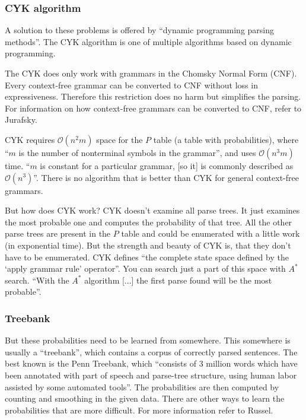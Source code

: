\documentclass[12pt,twoside]{scrartcl}
\theoremstyle{plain}
\theoremstyle{definition}
\theoremstyle{remark}
\begin{document}
		\subsubsection*{CYK algorithm}
		\label{subSubSec:cykAlgorithm}		
		
		A solution to these problems is offered by ``dynamic programming parsing methods''\cite[p.~469]{Jurafsky2009b}. The CYK algorithm is one of multiple algorithms based on dynamic programming.
		
		The CYK does only work with grammars in the Chomsky Normal Form (CNF). Every context-free grammar can be converted to CNF without loss in expressiveness. Therefore this restriction does no harm but simplifies the parsing. For information on how context-free grammars can be converted to CNF, refer to Jurafsky\cite{Jurafsky2009b}.
		
		CYK requires $\mathcal{O}(n^{2}m)$ space for the $P$ table (a table with probabilities), where ``$m$ is the number of nonterminal symbols in the grammar''\cite[p.~893]{Russel2010}, and uses $\mathcal{O}(n^{3}m)$ time. ``$m$ is constant for a particular grammar, [so it] is commonly described as $\mathcal{O}(n^{3})$''\cite[p.~893]{Russel2010}. There is no algorithm that is better than CYK for general context-free grammars\cite{Russel2010}. 
		
		But how does CYK work? CYK doesn't examine all parse trees. It just examines the most probable one and computes the probability of that tree. All the other parse trees are present in the $P$ table and could be enumerated with a little work (in exponential time). But the strength and beauty of CYK is, that they don't have to be enumerated. CYK defines ``the complete state space defined by the `apply grammar rule' operator''\cite[p.~894]{Russel2010}. You can search just a part of this space with $A^{*}$ search.\cite{Russel2010} ``With the $A^{*}$ algorithm [...] the first parse found will be the most probable''\cite[p.~895]{Russel2010}.
		
		\subsubsection*{Treebank}
		\label{subSubSec:treebank}
		
		But these probabilities need to be learned from somewhere. This somewhere is usually a ``treebank''\cite[p.~895]{Russel2010}, which contains a corpus of correctly parsed sentences. The best known is the Penn Treebank\cite{Russel2010}, which ``consists of 3 million words which have been annotated with part of speech and parse-tree structure, using human labor assisted by some automated tools''\cite[p.~895]{Russel2010}. The probabilities are then computed by counting and smoothing in the given data.\cite{Russel2010} There are other ways to learn the probabilities that are more difficult. For more information refer to Russel\cite{Russel2010}.		
		
\end{document}
